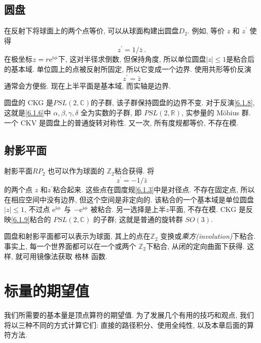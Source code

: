 \subsection*{圆盘}

在反射下将球面上的两个点等价, 可以从球面构建出圆盘$D_{2}$. 例如, 等价 $z$ 和 $z^{\prime}$ 使得
\begin{equation}
	z^{\prime}=1 / \bar{z} \:. \label{6.1.7}
\end{equation}
在极坐标$z=r \mathrm{e}^{\mathrm{i} \phi}$下, 这对半径求倒数, 但保持角度, 所以单位圆盘$|z| \leq 1$是粘合后的基本域. 单位圆上的点被反射所固定, 所以它变成一个边界. 
使用共形等价反演
\begin{equation}
	z^{\prime}=\bar{z}  \label{6.1.8}
\end{equation}
通常会方便些. 现在上半平面是基本域, 而实轴是边界.

圆盘的 CKG 是$PSL(2, \mathds{C})$的子群, 该子群保持圆盘的边界不变. 
对于反演\eqref{6.1.8}, 这就是\eqref{6.1.6}中 $\alpha, \beta, \gamma, \delta$ 全为实数的子群, 即 $P S L(2, \mathds{R})$, 实参量的 Möbius 群. 
一个 CKV 是圆盘上的普通旋转对称性. 又一次, 所有度规都等价, 不存在模.

\subsection*{射影平面}

射影平面$R P_{2}$ 也可以作为球面的 $\mathds{Z}_{2}$粘合获得. 将
\begin{equation}
	z^{\prime}=-1 / \bar{z} \label{6.1.9}
\end{equation}
的两个点 $z$ 和$z^{\prime}$粘合起来. 这些点在圆度规\eqref{6.1.3}中是对径点. 不存在固定点, 所以在相应空间中没有边界, 但这个空间是非定向的. 
该粘合的一个基本域是单位圆盘 $|z| \leq 1$, 不过点 $\mathrm{e}^{\mathrm{i} \phi}$ 与 $-\mathrm{e}^{\mathrm{i} \phi}$ 被粘合. 
另一选择是上半$z$平面, 不存在模. CKG 是反映\eqref{6.1.9}粘合的 $P S L(2, \mathds{C})$ 的子群; 这就是普通的旋转群 $SO(3)$.

圆盘和射影平面都可以表示为球面, 其上的点在$\mathds{Z}_{2}$ 变换或\emph{乘方(involution)}下粘合. 
事实上, 每一个世界面都可以在一个或两个 $\mathds{Z}_{2} $下粘合, 从闭的定向曲面下获得. 这样, 就可用镜像法获取 格林 函数.

\section{标量的期望值} \label{sec:6.2}

我们所需要的基本量是顶点算符的期望值. 为了发展几个有用的技巧和观点, 我们将以三种不同的方式计算它们: 直接的路径积分、使用全纯性, 以及本章后面的算符方法.

